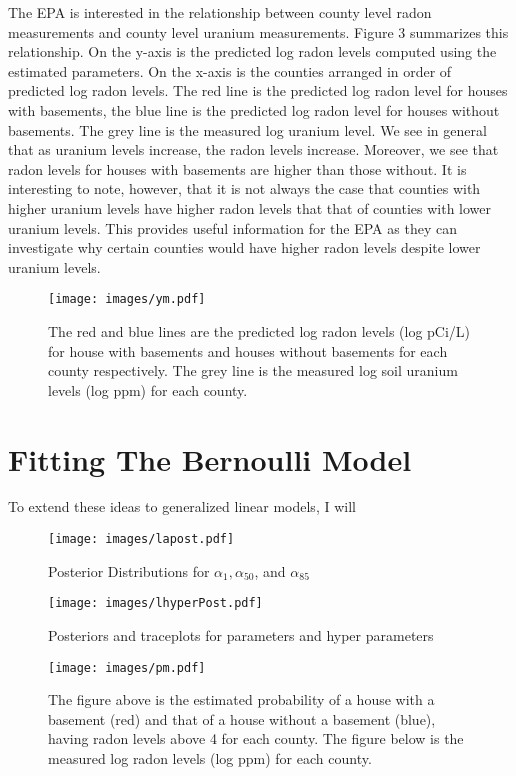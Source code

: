 \documentclass{article}
\def\beginmyfig{\begin{figure}[htbp]\begin{center}}
\def\endmyfig{\end{center}\end{figure}}
\begin{document}
\noindent
The EPA is interested in the relationship between county level radon
measurements and county level uranium measurements. Figure 3 summarizes this
relationship. On the y-axis is the predicted log radon levels computed using
the estimated parameters. On the x-axis is the counties arranged in order of
predicted log radon levels. The red line is the predicted log radon level
for houses with basements, the blue line is the predicted log radon level
for houses without basements. The grey line is the measured log uranium level.
We see in general that as uranium levels increase, the radon levels increase. 
Moreover, we see that radon levels for houses with basements are higher than
those without. It is interesting to note, however, that it is not always the
case that counties with higher uranium levels have higher radon levels that
that of counties with lower uranium levels. This provides useful information
for the EPA as they can investigate why certain counties would have higher 
radon levels despite lower uranium levels. 

\beginmyfig \texttt{[image: images/ym.pdf]}  
            \caption{The red and blue lines are the predicted log radon levels
            (log pCi/L) for house with basements and houses without basements
            for each county respectively. The grey line is the measured log
            soil uranium levels (log ppm) for each county.}\endmyfig 



\section{Fitting The Bernoulli Model}
To extend these ideas to generalized linear models, I will
\beginmyfig \texttt{[image: images/lapost.pdf]} 
            \caption{Posterior Distributions for $\alpha_1,\alpha_{50}$, and $\alpha_{85}$} \endmyfig 

\beginmyfig \texttt{[image: images/lhyperPost.pdf]} 
            \caption{Posteriors and traceplots for parameters and hyper parameters}\endmyfig 

\beginmyfig \texttt{[image: images/pm.pdf]}  
            \caption{The figure above is the estimated probability of a house
            with a basement (red) and that of a house without a basement
            (blue), having radon levels above 4 for each county. The figure
            below is the measured log radon levels (log ppm) for each
            county.}\endmyfig 
\end{document}
